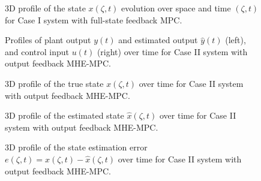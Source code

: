 \begin{figure}[!htbp]
    \centering
    
    \caption{3D profile of the state $x(\zeta, t)$ evolution over space and time $(\zeta, t)$ for Case I system with full-state feedback MPC.}
    \label{fig:MPC_x}
\end{figure}

\begin{figure}[!htbp]
    \centering
    
    \caption{Profiles of plant output $y(t)$ and estimated output $\hat{y}(t)$ (left), and control input $u(t)$ (right) over time for Case II system with output feedback MHE-MPC.}
    \label{fig:input_output_MHE}
\end{figure}

\begin{figure}[!htbp]
    \centering
    
    \caption{3D profile of the true state $x(\zeta, t)$ over time for Case II system with output feedback MHE-MPC.}
    \label{fig:MHE_x_true}
\end{figure}

\begin{figure}[!htbp]
    \centering
    
    \caption{3D profile of the estimated state $\hat{x}(\zeta, t)$ over time for Case II system with output feedback MHE-MPC.}
    \label{fig:MHE_x_estimated}
\end{figure}

\begin{figure}[!htbp]
    \centering
    
    \caption{3D profile of the state estimation error $e(\zeta, t) = x(\zeta, t) - \hat{x}(\zeta, t)$ over time for Case II system with output feedback MHE-MPC.}
    \label{fig:MHE_err}
\end{figure}

